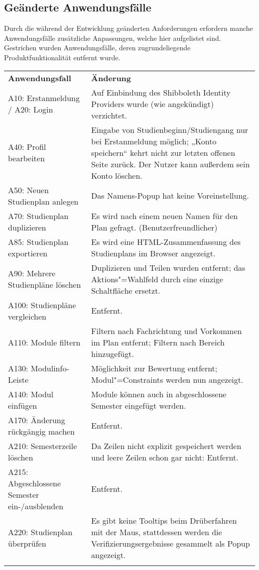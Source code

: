 \FloatBarrier
\subsection{Geänderte Anwendungsfälle}

Durch die während der Entwicklung geänderten Anforderungen erfordern manche Anwendungsfälle zusätzliche Anpassungen, welche hier aufgelistet sind. Gestrichen wurden Anwendungsfälle, deren zugrundeliegende Produktfunktionalität entfernt wurde.

\begin{longtable}{| >{\hspace{0pt}} p{} | >{\hspace{0pt}} p{} |}
	\hline
	\textbf{Anwendungsfall} & \textbf{Änderung} \\ 
	\hhline{|=|=|}  
	\endfirsthead
	\endhead
	A10: Erstanmeldung / \newline A20: Login 
	& Auf Einbindung des Shibboleth Identity Providers wurde (wie angekündigt) verzichtet. \\
	\hline
	A40: Profil bearbeiten
	& Eingabe von Studienbeginn/Studiengang nur bei Erstanmeldung möglich; „Konto speichern“ kehrt nicht zur letzten offenen Seite zurück. Der Nutzer kann außerdem sein Konto löschen. \\
	\hline
	A50: Neuen Studienplan anlegen
	& Das Namens-Popup hat keine Voreinstellung. \\
	\hline
	A70: Studienplan duplizieren
	& Es wird nach einem neuen Namen für den Plan gefragt. (Benutzerfreundlicher) \\
	\hline
	A85: Studienplan exportieren
	& Es wird eine HTML-Zusammenfassung des Studienplans im Browser angezeigt. \\
	\hline
	A90: Mehrere Studienpläne löschen
	& Duplizieren und Teilen wurden entfernt; das Aktions"=Wahlfeld durch eine einzige Schaltfläche ersetzt. \\ 
	\hline
	A100: Studienpläne vergleichen
	& Entfernt. \\
	\hline
	A110: Module filtern
	& Filtern nach Fachrichtung und Vorkommen im Plan entfernt; Filtern nach Bereich hinzugefügt. \\
	\hline
	A130: Modulinfo-Leiste
	& Möglichkeit zur Bewertung entfernt; Modul"=Constraints werden nun angezeigt. \\
	\hline
	A140: Modul einfügen
	& Module können auch in abgeschlossene Semester eingefügt werden. \\
	\hline
	A170: Änderung rückgängig machen
	& Entfernt. \\
	\hline
	A210: Semesterzeile löschen
	& Da Zeilen nicht explizit gespeichert werden und leere Zeilen schon gar nicht: Entfernt. \\
	\hline
	A215: Abgeschlossene Semester ein-/ausblenden
	& Entfernt. \\
	\hline
	A220: Studienplan überprüfen
	& Es gibt keine Tooltips beim Drüberfahren mit der Maus, stattdessen werden die Verifizierungsergebnisse gesammelt als Popup angezeigt. \\
	\hhline{|=|=|}
\end{longtable}

